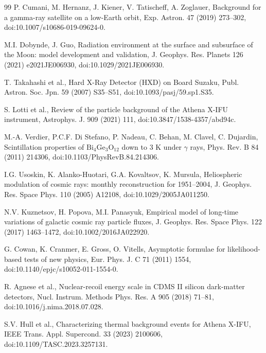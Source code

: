 \documentclass[11pt]{article}
\begin{document}
\begin{thebibliography}{99}
P. Cumani, M. Hernanz, J. Kiener, V. Tatischeff, A. Zoglauer,
Background for a gamma-ray satellite on a low-Earth orbit,
Exp. Astron. 47 (2019) 273--302,
doi:10.1007/s10686-019-09624-0.

M.I. Dobynde, J. Guo,
Radiation environment at the surface and subsurface of the Moon:
model development and validation,
J. Geophys. Res. Planets 126 (2021) e2021JE006930,
doi:10.1029/2021JE006930.

T. Takahashi et al., Hard X-Ray Detector (HXD) on Board Suzaku,
Publ. Astron. Soc. Jpn. 59 (2007) S35--S51,
doi:10.1093/pasj/59.sp1.S35.

S. Lotti et al.,
Review of the particle background of the Athena X-IFU instrument,
Astrophys. J. 909 (2021) 111,
doi:10.3847/1538-4357/abd94c.

M.-A. Verdier, P.C.F. Di Stefano, P. Nadeau, C. Behan, M. Clavel, C. Dujardin,
Scintillation properties of $\mathrm{Bi_4Ge_3O_{12}}$ down to 3 K under
$\gamma$ rays,
Phys. Rev. B 84 (2011) 214306,
doi:10.1103/PhysRevB.84.214306.

I.G. Usoskin, K. Alanko-Huotari, G.A. Kovaltsov, K. Mursula,
Heliospheric modulation of cosmic rays: monthly reconstruction for 1951--2004,
J. Geophys. Res. Space Phys. 110 (2005) A12108,
doi:10.1029/2005JA011250.

N.V. Kuznetsov, H. Popova, M.I. Panasyuk,
Empirical model of long-time variations of galactic cosmic ray particle fluxes,
J. Geophys. Res. Space Phys. 122 (2017) 1463--1472,
doi:10.1002/2016JA022920.

G. Cowan, K. Cranmer, E. Gross, O. Vitells, Asymptotic formulae for likelihood-based tests of new physics, Eur. Phys. J. C 71 (2011) 1554, doi:10.1140/epjc/s10052-011-1554-0.

R. Agnese et al., Nuclear-recoil energy scale in CDMS II silicon dark-matter detectors, Nucl. Instrum. Methods Phys. Res. A 905 (2018) 71--81, doi:10.1016/j.nima.2018.07.028.

S.V. Hull et al., Characterizing thermal background events for Athena X-IFU, IEEE Trans. Appl. Supercond. 33 (2023) 2100606, doi:10.1109/TASC.2023.3257131.

\end{thebibliography}
\end{document}
